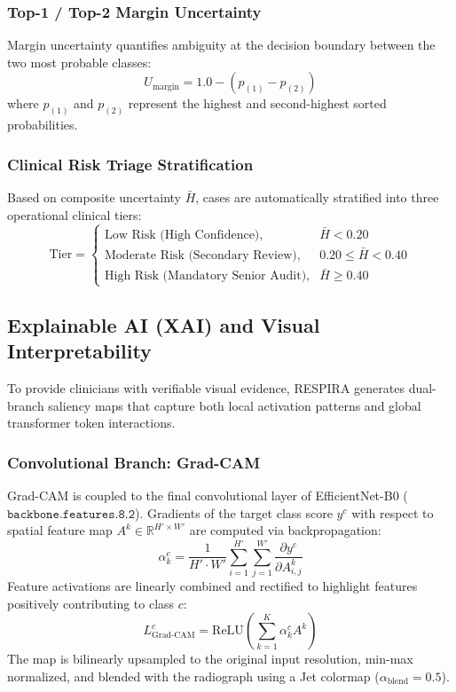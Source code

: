 \documentclass[journal]{IEEEtran}
\begin{document}
\subsubsection{Top-1 / Top-2 Margin Uncertainty}
Margin uncertainty quantifies ambiguity at the decision boundary between the two most probable classes:
\begin{equation}
U_{\text{margin}} = 1.0 - \left( p_{(1)} - p_{(2)} \right)
\label{eq:margin_uncertainty}
\end{equation}
where $p_{(1)}$ and $p_{(2)}$ represent the highest and second-highest sorted probabilities.

\subsubsection{Clinical Risk Triage Stratification}
Based on composite uncertainty $\bar{H}$, cases are automatically stratified into three operational clinical tiers:
\begin{equation}
\text{Tier} = \begin{cases}
\text{Low Risk (High Confidence)}, & \bar{H} < 0.20 \\
\text{Moderate Risk (Secondary Review)}, & 0.20 \le \bar{H} < 0.40 \\
\text{High Risk (Mandatory Senior Audit)}, & \bar{H} \ge 0.40
\end{cases}
\end{equation}

\subsection{Explainable AI (XAI) and Visual Interpretability}
\label{subsec:explainability}

To provide clinicians with verifiable visual evidence, RESPIRA generates dual-branch saliency maps that capture both local activation patterns and global transformer token interactions.

\subsubsection{Convolutional Branch: Grad-CAM}
Grad-CAM is coupled to the final convolutional layer of EfficientNet-B0 ($\texttt{backbone.features.8.2}$). Gradients of the target class score $y^c$ with respect to spatial feature map $A^k \in \mathbb{R}^{H' \times W'}$ are computed via backpropagation:
\begin{equation}
\alpha_k^c = \frac{1}{H' \cdot W'} \sum_{i=1}^{H'} \sum_{j=1}^{W'} \frac{\partial y^c}{\partial A_{i, j}^k}
\end{equation}
Feature activations are linearly combined and rectified to highlight features positively contributing to class $c$:
\begin{equation}
L_{\text{Grad-CAM}}^c = \text{ReLU}\left( \sum_{k=1}^K \alpha_k^c A^k \right)
\label{eq:gradcam}
\end{equation}
The map is bilinearly upsampled to the original input resolution, min-max normalized, and blended with the radiograph using a Jet colormap ($\alpha_{\text{blend}} = 0.5$).
\end{document}

